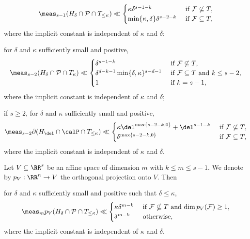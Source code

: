 \begin{prop}
\begin{enumeratei}
\[\meas_{s-1} (H_\delta \cap \mathcal P \cap T_{\leq \kappa}) \ll \begin{cases}
\kappa \delta^{s-1-k} & \text{ if } \mathcal F\not\subseteq T,\\
\min\{\kappa,\delta\} \delta^{s-2-k} & \text{ if } \mathcal F\subseteq T,
\end{cases}
\]
where the implicit constant is independent of $\kappa$ and $\delta$;
\item
\label{item:volume_s-2_delta_kappa}
for $\delta$ and $\kappa$ sufficiently small and positive,
\[
\meas_{s-2} (H_\delta \cap \mathcal P \cap T_{\kappa}) \ll \begin{cases}
\delta^{s-1-k} & \text{ if } \mathcal F\not\subseteq T,\\
\delta^{d-k-1}\min\{\delta,\kappa\}^{s-d-1} & \text{ if } \mathcal F\subseteq T \text{ and } k\leq s-2,\\
1 & \text{ if } k=s-1,
\end{cases}
\]
where the implicit constant is independent of $\kappa$ and $\delta$;
\item
\label{item:volume_boundary_kappa}
if $s\geq 2$, for $\delta$ and $\kappa$ sufficiently small and positive,
\begin{gather*}
\meas_{s-2} \partial (H_{\del}\cap \calP\cap T_{\leq\kappa})
\ll\begin{cases}
\kappa \del^{\max\{s-2-k,0\}} + \del^{s-1-k} & \text{ if } \mathcal F\not\subseteq T, \\
\delta^{\max\{s-2-k, 0\}} & \text{ if } \mathcal F\subseteq T,
\end{cases}
\end{gather*}
where the implicit constant is independent of $\kappa$ and $\delta$.
\end{enumeratei}
Let $V\subseteq\RR^s$ be an affine space of dimension $m$ with $k\leq m\leq s-1$. We denote by $p_V:\RR^n\to V$ the orthogonal projection onto $V$. Then
\begin{enumeratei}\setcounter{enumi}{5}
\item
\label{item:volume_proj}
for $\delta$ and $\kappa$ sufficiently small and positive such that $\delta\leq\kappa$,
\begin{equation*}
\meas_mp_V(H_\delta\cap\mathcal P\cap T_{\leq \kappa})
\ll \begin{cases}
\kappa \delta^{m-k} & \text{ if $\mathcal F\nsubseteq T$ and $\dim p_V(\mathcal F)\geq 1$,}\\
\delta^{m-k} & \text{ otherwise,}
\end{cases}
\end{equation*}
where the implicit constant is independent of $\kappa$ and $\delta$.
\end{enumeratei}
\end{prop}
